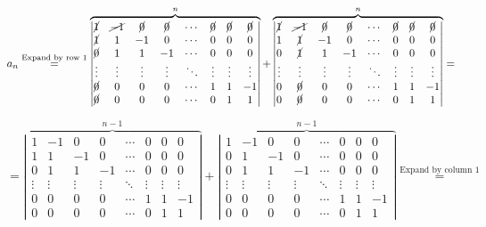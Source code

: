 \documentclass{article}
\begin{document}
\( a_n \overset{\textrm{Expand by row 1}}{=} \overbrace{\left|\begin{matrix} \cancel{1} & \cancel{-1} & \cancel{0} & \cancel{0} & \cdots & \cancel{0} & \cancel{0} & \cancel{0} \\ \cancel{1} & 1 & -1 & 0 & \cdots & 0 & 0 & 0 \\ \cancel{0} & 1 & 1 & -1 & \cdots & 0 & 0 & 0 \\ \vdots & \vdots & \vdots & \vdots & \ddots & \vdots & \vdots & \vdots \\ \cancel{0} & 0 & 0 & 0 & \cdots & 1 & 1 & -1 \\ \cancel{0} & 0 & 0 & 0 & \cdots & 0 & 1 & 1\end{matrix}\right|}^n + \overbrace{\left|\begin{matrix}\cancel{1} & \cancel{-1} & \cancel{0} & \cancel{0} & \cdots & \cancel{0} & \cancel{0} & \cancel{0} \\ 1 & \cancel{1} & -1 & 0 & \cdots & 0 & 0 & 0 \\ 0 & \cancel{1} & 1 & -1 & \cdots & 0 & 0 & 0 \\ \vdots & \vdots & \vdots & \vdots & \ddots & \vdots & \vdots & \vdots \\ 0 & \cancel{0} & 0 & 0 & \cdots & 1 & 1 & -1 \\ 0 & \cancel{0} & 0 & 0 & \cdots & 0 & 1 & 1\end{matrix}\right|}^n = \)

\( = \overbrace{\left|\begin{matrix}1 & -1 & 0 & 0 & \cdots & 0 & 0 & 0 \\ 1 & 1 & -1 & 0 & \cdots & 0 & 0 & 0 \\ 0 & 1 & 1 & -1 & \cdots & 0 & 0 & 0 \\ \vdots & \vdots & \vdots & \vdots & \ddots & \vdots & \vdots & \vdots \\ 0 & 0 & 0 & 0 & \cdots & 1 & 1 & -1 \\ 0 & 0 & 0 & 0 & \cdots & 0 & 1 & 1\end{matrix}\right|}^{n-1} + \overbrace{\left|\begin{matrix}1 & -1 & 0 & 0 & \cdots & 0 & 0 & 0 \\ 0 & 1 & -1 & 0 & \cdots & 0 & 0 & 0 \\ 0 & 1 & 1 & -1 & \cdots & 0 & 0 & 0 \\ \vdots & \vdots & \vdots & \vdots & \ddots & \vdots & \vdots & \vdots \\ 0 & 0 & 0 & 0 & \cdots & 1 & 1 & -1 \\ 0 & 0 & 0 & 0 & \cdots & 0 & 1 & 1\end{matrix}\right|}^{n-1} \overset{\textrm{Expand by column 1}}{=} \)
\end{document}
